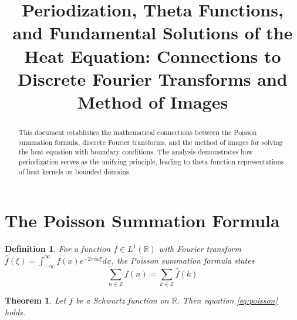 \documentclass{article}
\title{Periodization, Theta Functions, and Fundamental Solutions of the Heat Equation: Connections to Discrete Fourier Transforms and Method of Images}
\author{}
\date{}
\newtheorem{theorem}{Theorem}
\newtheorem{definition}{Definition}
\begin{document}
\maketitle

\begin{abstract}
This document establishes the mathematical connections between the Poisson summation formula, discrete Fourier transforms, and the method of images for solving the heat equation with boundary conditions. The analysis demonstrates how periodization serves as the unifying principle, leading to theta function representations of heat kernels on bounded domains.
\end{abstract}

\section{The Poisson Summation Formula}

\begin{definition}
For a function $f \in L^1(\mathbb{R})$ with Fourier transform $\hat{f}(\xi) = \int_{-\infty}^{\infty} f(x) e^{-2\pi i x \xi} dx$, the Poisson summation formula states
\begin{equation}
\label{eq:poisson}
\sum_{n \in \mathbb{Z}} f(n) = \sum_{k \in \mathbb{Z}} \hat{f}(k)
\end{equation}
\end{definition}

\begin{theorem}
Let $f$ be a Schwartz function on $\mathbb{R}$. Then equation \eqref{eq:poisson} holds.
\end{theorem}
\end{document}
